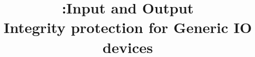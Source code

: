 

\newif\ifpaper
\papertrue


\newif\ifdesperatetime

\graphicspath{{images/}}


\title{\name:Input and Output\\ Integrity protection for Generic IO devices}

\iffalse
\author{\IEEEauthorblockN{Aritra Dhar}
\IEEEauthorblockA{ETH Z{\"u}rich\\
aritra.dhar@inf.ethz.ch}
}
\fi
\maketitle
\begin{abstract}

\end{abstract}

\IEEEpeerreviewmaketitle









%  
%


